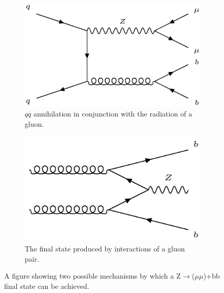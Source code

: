 \documentclass[12pt,a4paper,epsf,portrait,times,epsfig]{report}
\begin{document}
		
		\begin{figure}[h!]
			\begin{subfigure}{.45\textwidth}
				\centering
				\includegraphics[scale=0.5]{Zbb_2.png}
				\caption{$q\overline{q}$ annihilation in conjunction with \newline the radiation of a gluon.}
				\label{Fig:SFigAnnihilationFeynman}
			\end{subfigure}
			\begin{subfigure}{.45\textwidth}
				\centering
				\includegraphics[scale=0.42]{Gluon_Pair.png}
				\caption{The final state produced by interactions \newline of a gluon pair.}
				\label{Fig:SFigGluonPairFeynman}
			\end{subfigure}
			\caption{A figure showing two possible mechanisms by which a Z$\rightarrow$($\mu\mu$)+bb final state can be achieved. }
			\label{Fig:FeynmanProcesses}
		\end{figure}
		

		
\end{document}
